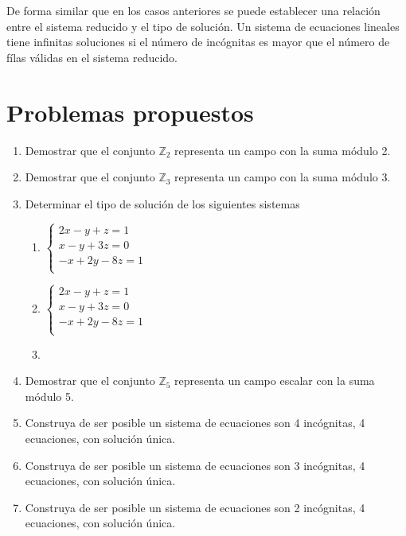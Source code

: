 De forma similar que en los casos anteriores se puede establecer una relación entre el sistema reducido y el tipo de solución. Un sistema de ecuaciones lineales tiene infinitas soluciones si el número de incógnitas es mayor que el número de fílas válidas en el sistema reducido.
\newpage
\section{Problemas propuestos}


\begin{enumerate}[1.]
\item Demostrar que el conjunto $\mathbb{Z}_2$ representa un campo con la suma módulo 2.
\item Demostrar que el conjunto $\mathbb{Z}_3$ representa un campo con la suma módulo 3.
\item Determinar el tipo de solución de los siguientes sistemas

\begin{enumerate}
\item $\left\lbrace \begin{aligned}
2x-y+z=1\\
x-y+3z=0\\
-x+2y-8z=1\\
\end{aligned}\right.$
\item $\left\lbrace \begin{aligned}
2x-y+z=1\\
x-y+3z=0\\
-x+2y-8z=1\\
\end{aligned}\right.$
\item {}

\end{enumerate}
\item Demostrar que el conjunto $\mathbb{Z}_5$ representa un campo escalar con la suma módulo 5.
\item Construya de ser posible un sistema de ecuaciones son 4 incógnitas, 4 ecuaciones, con solución única.
\item Construya de ser posible un sistema de ecuaciones son 3 incógnitas, 4 ecuaciones, con solución única.
\item Construya de ser posible un sistema de ecuaciones son 2 incógnitas, 4 ecuaciones, con solución única.

\end{enumerate}
